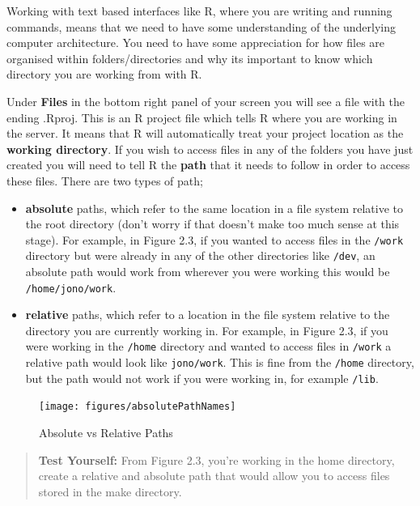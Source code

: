 \documentclass[
]{book}
\providecommand{\tightlist}{%
  \setlength{\itemsep}{0pt}\setlength{\parskip}{0pt}}
\begin{document}
Working with text based interfaces like R, where you are writing and running commands, means that we need to have some understanding of the underlying computer architecture. You need to have some appreciation for how files are organised within folders/directories and why its important to know which directory you are working from with R.

Under \textbf{Files} in the bottom right panel of your screen you will see a file with the ending .Rproj. This is an R project file which tells R where you are working in the server. It means that R will automatically treat your project location as the \textbf{working directory}. If you wish to access files in any of the folders you have just created you will need to tell R the \textbf{path} that it needs to follow in order to access these files. There are two types of path;

\begin{itemize}
\tightlist
\item
  \textbf{absolute} paths, which refer to the same location in a file system relative to the root directory (don't worry if that doesn't make too much sense at this stage). For example, in Figure 2.3, if you wanted to access files in the \texttt{/work} directory but were already in any of the other directories like \texttt{/dev}, an absolute path would work from wherever you were working this would be \texttt{/home/jono/work}.
\item
  \textbf{relative} paths, which refer to a location in the file system relative to the directory you are currently working in. For example, in Figure 2.3, if you were working in the \texttt{/home} directory and wanted to access files in \texttt{/work} a relative path would look like \texttt{jono/work}. This is fine from the \texttt{/home} directory, but the path would not work if you were working in, for example \texttt{/lib}.
\end{itemize}

\begin{figure}
\texttt{[image: figures/absolutePathNames]} \caption{Absolute vs Relative Paths}\label{fig:unnamed-chunk-25}
\end{figure}

\begin{quote}
\textbf{Test Yourself:}
From Figure 2.3, you're working in the home directory, create a relative and absolute path that would allow you to access files stored in the make directory.
\end{quote}
\end{document}
